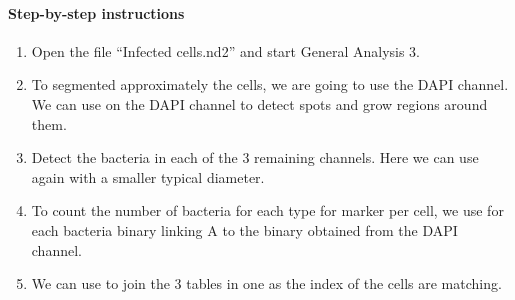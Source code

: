 \paragraph{Step-by-step instructions}
\begin{enumerate}
    \item Open the file ``Infected cells.nd2'' and start General Analysis 3.
    \item To segmented approximately the cells, we are going to use the DAPI channel. We can use   on the DAPI channel to detect spots and grow regions around them.
    \item Detect the bacteria in each of the 3 remaining channels. Here we can use again   with a smaller typical diameter.
    \item To count the number of bacteria for each type for marker per cell, we use  for each bacteria binary linking A to the binary obtained from the DAPI channel.
    \item We can use  to join the 3 tables in one as the index of the cells are matching.
\end{enumerate}

